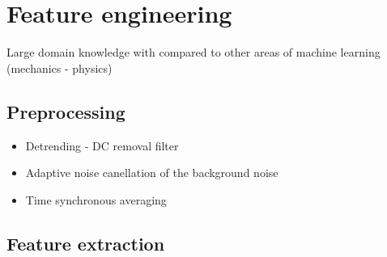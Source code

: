 \section{Feature engineering}
Large domain knowledge with compared to other areas of machine learning (mechanics - physics)
\subsection{Preprocessing}
\begin{itemize}
\item Detrending - DC removal filter
\item Adaptive noise canellation of the background noise
\item Time synchronous averaging
\end{itemize}

\subsection{Feature extraction}
\cite{zheng_feature_2018}
\cite{johnson_feature_2019}
\cite{altaf_new_2022}
\cite{mostafavi_novel_2021}
\cite{brito_fault_2021}
\cite{peeters_large_2004}
\cite{zhuo_research_2022}  
\cite{mohammadi_early_2020}
\cite{egaji_data_2020}
\cite{nandi_condition_2019}

\cite{jung_vibration_2017}

